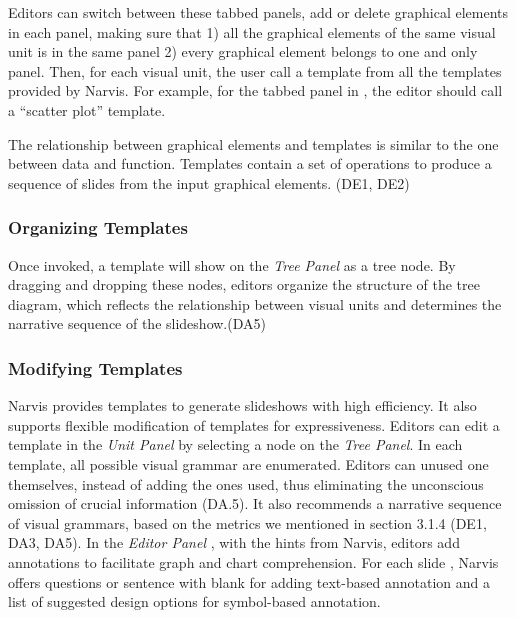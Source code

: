 Editors can switch between these tabbed panels, add or delete graphical elements in each panel, making sure that 1) all the graphical elements of the same visual unit is in the same panel 2) every graphical element belongs to one and only panel. Then, for each visual unit, the user call a template from all the templates provided by Narvis. For example, for the tabbed panel in , the editor should call a ``scatter plot'' template.


The relationship between graphical elements and templates is similar to the one between data and function. Templates contain a set of operations to produce a sequence of slides from the input graphical elements.  (DE1, DE2) 

\subsubsection{Organizing Templates} 
Once invoked, a template will show on the \textit{Tree Panel} as a tree node. 
By dragging and dropping these nodes, editors organize the structure of the tree diagram, which reflects the relationship between visual units and determines the narrative sequence of the slideshow.(DA5) 

\subsubsection{Modifying Templates} 
Narvis provides templates to generate slideshows with high efficiency. 
It also supports flexible modification of templates for expressiveness.
Editors can edit a template in the \textit{Unit Panel} by selecting a node on the \textit{Tree Panel}. In each template, all possible visual grammar are enumerated. Editors can unused one themselves, instead of adding the ones used, thus eliminating the unconscious omission of crucial information (DA.5). 
It also recommends a narrative sequence of visual grammars, based on the metrics we mentioned in section 3.1.4 (DE1, DA3, DA5). 
In the \textit{Editor Panel} , with the hints from Narvis, editors add annotations to facilitate graph and chart comprehension. For each slide , Narvis offers questions or sentence with blank for adding text-based annotation and a list of suggested design options for symbol-based annotation. 

